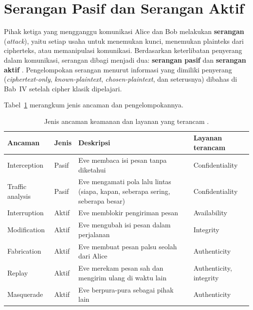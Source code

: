 ﻿\section{Serangan Pasif dan Serangan Aktif}
\label{sec:serangan-pasif-aktif}

Pihak ketiga yang mengganggu komunikasi Alice dan Bob melakukan \textbf{serangan} (\textit{attack}), yaitu setiap usaha untuk menemukan kunci, menemukan plainteks dari cipherteks, atau memanipulasi komunikasi. Berdasarkan keterlibatan penyerang dalam komunikasi, serangan dibagi menjadi dua: \textbf{serangan pasif} dan \textbf{serangan aktif} \cite{munir_slides_itb,stallings2017}. Pengelompokan serangan menurut informasi yang dimiliki penyerang (\textit{ciphertext-only}, \textit{known-plaintext}, \textit{chosen-plaintext}, dan seterusnya) dibahas di Bab~IV setelah cipher klasik dipelajari.

Tabel~\ref{tab:ancaman-keamanan} merangkum jenis ancaman dan pengelompokannya.

\begin{table}[htbp]
\centering
\small
\begin{tabular}{@{}>{\raggedright\arraybackslash}p{2.8cm}>{\raggedright\arraybackslash}p{1.2cm}>{\raggedright\arraybackslash}p{5.8cm}>{\raggedright\arraybackslash}p{3cm}@{}}
\toprule
\textbf{Ancaman} & \textbf{Jenis} & \textbf{Deskripsi} & \textbf{Layanan terancam} \\
\midrule
Interception & Pasif & Eve membaca isi pesan tanpa diketahui & Confidentiality \\
Traffic analysis & Pasif & Eve mengamati pola lalu lintas (siapa, kapan, seberapa sering, seberapa besar) & Confidentiality \\
Interruption & Aktif & Eve memblokir pengiriman pesan & Availability \\
Modification & Aktif & Eve mengubah isi pesan dalam perjalanan & Integrity \\
Fabrication & Aktif & Eve membuat pesan palsu seolah dari Alice & Authenticity \\
Replay & Aktif & Eve merekam pesan sah dan mengirim ulang di waktu lain & Authenticity, integrity \\
Masquerade & Aktif & Eve berpura-pura sebagai pihak lain & Authenticity \\
\bottomrule
\end{tabular}
\caption{Jenis ancaman keamanan dan layanan yang terancam \cite{stallings2017,rfc4949}.}
\label{tab:ancaman-keamanan}
\end{table}

